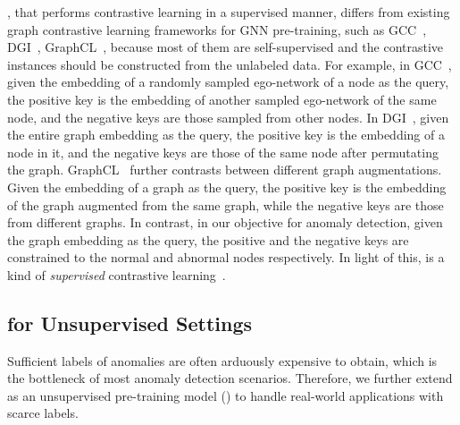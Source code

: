 \model, that performs contrastive learning in a supervised manner, differs from existing graph contrastive learning frameworks for GNN pre-training, such as GCC~\cite{qiu2020gcc}, DGI~\cite{velickovic2019deep}, GraphCL~\cite{you2020graph}, because most of them are self-supervised and the contrastive instances should be constructed from the unlabeled data.  
For example, in GCC~\cite{qiu2020gcc}, given the embedding of a randomly sampled ego-network of a node as the query, the positive key is the embedding of another sampled ego-network of the same node, and the negative keys are those sampled from other nodes. 
In DGI~\cite{velickovic2019deep}, given the entire graph embedding as the query, the positive key is the embedding of a node in it, and the negative keys are those of the same node after permutating the graph. GraphCL~\cite{you2020graph} further contrasts between different graph augmentations. Given the embedding of a graph as the query, the positive key is the embedding of the graph augmented from the same graph, while the negative keys are those from different graphs. 
In contrast, in our objective for anomaly detection, given the graph embedding as the query, the positive and the negative keys are constrained to the normal and abnormal nodes respectively. In light of this, \smodel is a kind of \textit{supervised} contrastive learning~\cite{khosla2020supervised}. 




\subsection{\spmodel for Unsupervised Settings}
\label{subsec:self}

Sufficient labels of anomalies are often arduously expensive to obtain, which is the bottleneck of most anomaly detection scenarios. 
Therefore, we further extend \smodel as an unsupervised pre-training model (\pmodel) to handle real-world applications with scarce labels. 



